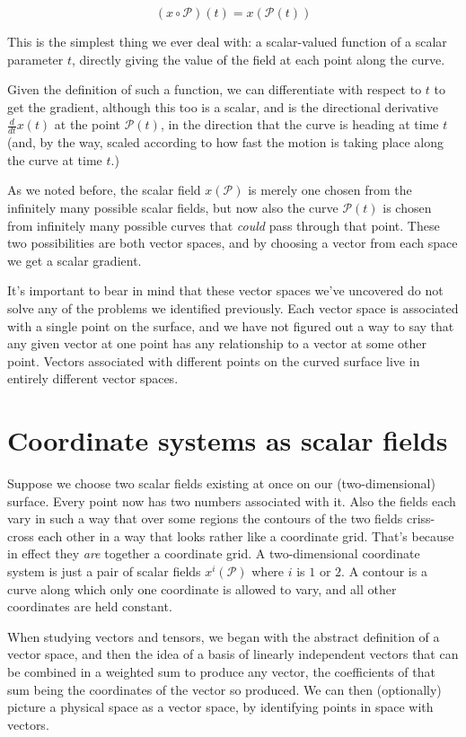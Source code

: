 $$
(x \circ \mathcal{P})(t) = x(\mathcal{P}(t))
$$

This is the simplest thing we ever deal with: a scalar-valued function of a scalar parameter $t$, directly giving the value of the field at each point along the curve.

Given the definition of such a function, we can differentiate with respect to $t$ to get the gradient, although this too is a scalar, and is the directional derivative $\frac{d}{dt} x(t)$ at the point $\mathcal{P}(t)$, in the direction that the curve is heading at time $t$ (and, by the way, scaled according to how fast the motion is taking place along the curve at time $t$.)

As we noted before, the scalar field $x(\mathcal{P})$ is merely one chosen from the infinitely many possible scalar fields, but now also the curve $\mathcal{P}(t)$ is chosen from infinitely many possible curves that \textit{could} pass through that point. These two possibilities are both vector spaces, and by choosing a vector from each space we get a scalar gradient.

It's important to bear in mind that these vector spaces we've uncovered do not solve any of the problems we identified previously. Each vector space is associated with a single point on the surface, and we have not figured out a way to say that any given vector at one point has any relationship to a vector at some other point. Vectors associated with different points on the curved surface live in entirely different vector spaces.

\section{Coordinate systems as scalar fields}

Suppose we choose two scalar fields existing at once on our (two-dimensional) surface. Every point now has two numbers associated with it. Also the fields each vary in such a way that over some regions the contours of the two fields criss-cross each other in a way that looks rather like a coordinate grid. That's because in effect they \textit{are} together a coordinate grid. A two-dimensional coordinate system is just a pair of scalar fields $x^i(\mathcal{P})$ where $i$ is $1$ or $2$. A contour is a curve along which only one coordinate is allowed to vary, and all other coordinates are held constant.

When studying vectors and tensors, we began with the abstract definition of a vector space, and then the idea of a basis of linearly independent vectors that can be combined in a weighted sum to produce any vector, the coefficients of that sum being the coordinates of the vector so produced. We can then (optionally) picture a physical space as a vector space, by identifying points in space with vectors.

